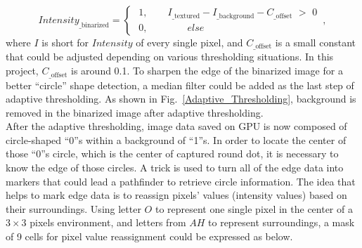 \begin{equation}
%
Intensity_{\text{\_binarized}} = %
%
\begin{cases}
\,\, 1 , \quad \quad I_{\text{\_textured}} - I_{\text{\_background}}  -  C_{\text{\_offset}} \,\, > \,\,0 %
\\%
\,\, 0 , \quad \quad \quad \quad else%
\end{cases}
 \, ,%
\end{equation}%
%
where \(I\) is short for \(Intensity\) of every single pixel, and \(C_{\text{\_offset}}\) is a small constant that could be adjusted depending on various thresholding situations. In this project, \(C_{\text{\_offset}}\) is around 0.1.%
%
To sharpen the edge of the binarized image for a better \enquote{circle} shape detection, a median filter could be added as the last step of adaptive thresholding. As shown in Fig.~\ref{Adaptive_Thresholding}, background is removed in the binarized image after adaptive thresholding.
\\\indent
%
%
After the adaptive thresholding, image data saved on GPU is now composed of circle-shaped \enquote{0}s within a background of \enquote{1}s. In order to locate the center of those \enquote{0}s circle, which is the center of captured round dot, it is necessary to know the edge of those circles. A trick is used to turn all of the edge data into markers that could lead a pathfinder to retrieve circle information.%
%
The idea that helps to mark edge data is to reassign pixels' values (intensity values) based on their surroundings. Using letter \(O\) to represent one single pixel in the center of a $3\times3$ pixels environment, and letters from \(A\)\texttildelow \(H\) to represent surroundings, a mask of 9 cells for pixel value reassignment could be expressed as below.

